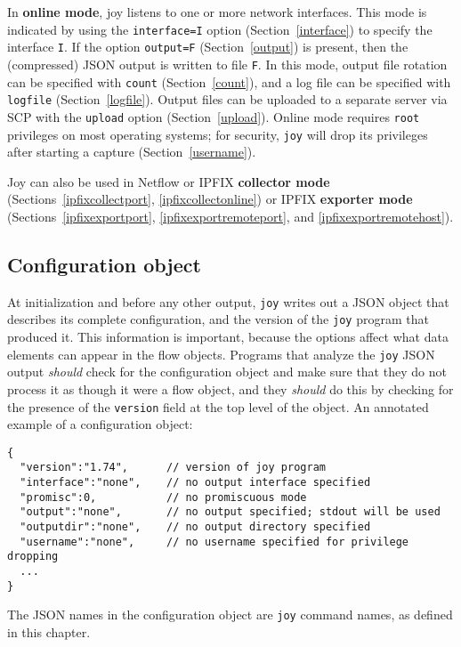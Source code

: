 \documentclass{book}
\begin{document}
In \textbf{online mode}, joy listens to one or more network
interfaces.  This mode is indicated by using the \texttt{interface=I}
option (Section~\ref{interface}) to specify the interface \texttt{I}.
If the option \texttt{output=F} (Section~\ref{output}) is present,
then the (compressed) JSON output is written to file \texttt{F}.  In
this mode, output file rotation can be specified with \texttt{count}
(Section~\ref{count}), and a log file can be specified with
\texttt{logfile} (Section~\ref{logfile}).  Output files can be
uploaded to a separate server via SCP with the \texttt{upload} option
(Section~\ref{upload}).  Online mode requires \texttt{root} privileges
on most operating systems; for security, \texttt{joy} will drop its
privileges after starting a capture (Section~\ref{username}).

Joy can also be used in Netflow or IPFIX \textbf{collector mode}
(Sections~\ref{ipfixcollectport}, \ref{ipfixcollectonline}) or IPFIX
\textbf{exporter mode} (Sections~\ref{ipfixexportport},
\ref{ipfixexportremoteport}, and \ref{ipfixexportremotehost}).

\subsection{Configuration object}
At initialization and before any other output, \texttt{joy} writes out
a JSON object that describes its complete configuration, and the
version of the \texttt{joy} program that produced it.  This
information is important, because the options affect what data
elements can appear in the flow objects.  Programs that analyze the
\texttt{joy} JSON output \textit{should} check for the configuration
object and make sure that they do not process it as though it were a
flow object, and they \textit{should} do this by checking
for the presence of the \texttt{version} field at the top level
of the object.  An annotated example of a configuration object:
\begin{mdframed}[style=cli]
\begin{verbatim}
{
  "version":"1.74",      // version of joy program 
  "interface":"none",    // no output interface specified
  "promisc":0,           // no promiscuous mode
  "output":"none",       // no output specified; stdout will be used
  "outputdir":"none",    // no output directory specified
  "username":"none",     // no username specified for privilege dropping
  ...
}
\end{verbatim}
\end{mdframed}
The JSON names in the configuration object are \texttt{joy} command
names, as defined in this chapter.  
\end{document}

